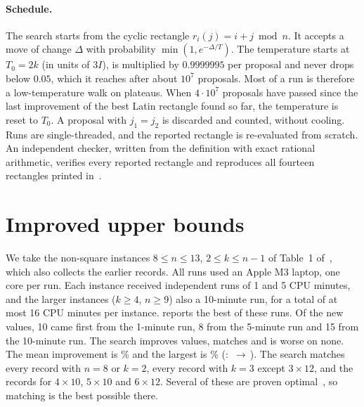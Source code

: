 \documentclass[11pt]{article}
\theoremstyle{plain}
\theoremstyle{definition}
\theoremstyle{remark}
\begin{document}
\paragraph{Schedule.} The search starts from the cyclic rectangle $r_i(j)=i+j \bmod n$. It accepts
a move of change $\Delta$ with probability $\min(1,e^{-\Delta/T})$. The temperature starts at
$T_0=2k$ (in units of $3I$), is multiplied by $0.9999995$ per proposal and never drops below
$0.05$, which it reaches after about $10^7$ proposals. Most of a run is therefore a
low-temperature walk on plateaus. When $4\cdot10^7$ proposals have passed since the last
improvement of the best Latin rectangle found so far, the temperature is reset to $T_0$. A proposal
with $j_1=j_2$ is discarded and counted, without cooling. Runs are single-threaded, and the
reported rectangle is re-evaluated from scratch. An independent checker, written from the
definition with exact rational arithmetic, verifies every reported rectangle and
reproduces all fourteen rectangles printed
in~\citep{RamaswamySzeider2023,VoborilRamaswamySzeider2025}.

\section{Improved upper bounds}\label{sec:results}

We take the \NumCells{} non-square instances $8\le n\le13$, $2\le k\le n-1$ of Table~1
of~\citep{VoborilRamaswamySzeider2025}, which also collects the earlier records. All runs used an
Apple M3 laptop, one core per run. Each instance received independent runs of 1 and 5 CPU
minutes, and the larger instances ($k\ge4$, $n\ge9$) also a 10-minute run, for a total of at
most 16 CPU minutes per instance.  reports the best of these runs. Of the
\NumImproved{} new values, 10 came first from the 1-minute run, 8 from the 5-minute run and 15
from the 10-minute run.
The search improves \NumImproved{} values, matches \NumMatched{} and is worse on none. The mean
improvement is \MeanGain\% and the largest is \MaxGain\% (\TopCell: \TopOld{}$\,\to\,$\TopNew). The
search matches every record with $n=8$ or $k=2$, every record with $k=3$ except $3\times12$, and
the records for $4\times10$, $5\times10$ and $6\times12$. Several of these are proven
optimal~\citep{RamaswamySzeider2023,MirkaEtAl2023}, so matching is the best possible there.

\begin{table}[t]
\centering
\small

\caption{Minimum known imbalance of $k\times n$ Latin rectangles. Bold: new value from this
work (best of the 1-, 5- and 10-minute runs), with the previous best value struck through below it.
Previous values are those collected in Table~1 of~\citet{VoborilRamaswamySzeider2025}, which
includes results of \citep{DiazLeBrasGomes2017,RamaswamySzeider2023} and of LLM-generated
streamliners. Plain: a record that our search matches.}
\label{tab:results}
\end{table}
\end{document}

